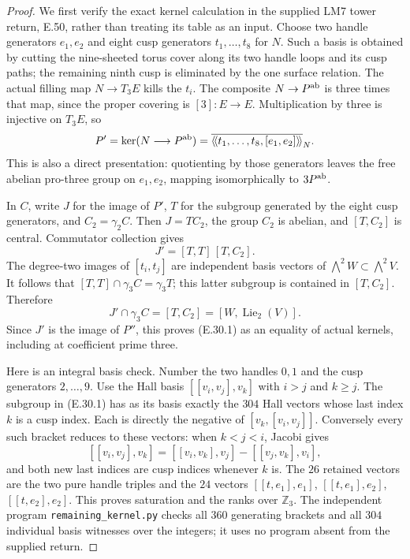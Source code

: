 \begin{proof}
We first verify the exact kernel calculation in the supplied
LM7 tower return, E.50, rather than treating its table as an input.
Choose two handle generators $e_1,e_2$ and eight cusp generators
$t_1,\ldots,t_8$ for $N$. Such a basis is obtained by cutting the
nine-sheeted torus cover along its two handle loops and its cusp
paths; the remaining ninth cusp is eliminated by the one surface
relation. The actual filling map $N\to T_3E$ kills the $t_i$.
The composite $N\to P^{\rm ab}$ is three times that map, since the
proper covering is $[3]:E\to E$. Multiplication by three is
injective on $T_3E$, so
\[
 P'=\ker(N\longrightarrow P^{\rm ab})
    =\overline{\langle\!\langle t_1,\ldots,t_8,[e_1,e_2]
                              \rangle\!\rangle}_N.
\]
This is also a direct presentation: quotienting by those generators
leaves the free abelian pro-three group on $e_1,e_2$, mapping
isomorphically to $3P^{\rm ab}$.

In $C$, write $J$ for the image of $P'$, $T$ for the subgroup
generated by the eight cusp generators, and $C_2=\gamma_2C$.
Then $J=T C_2$, the group $C_2$ is abelian, and $[T,C_2]$
is central. Commutator collection gives
\[
 J'=[T,T]\,[T,C_2].
\]
The degree-two images of $[t_i,t_j]$ are independent basis
vectors of $\bigwedge^2W\subset\bigwedge^2V$.
It follows that $[T,T]\cap\gamma_3C=\gamma_3T$;
this latter subgroup is contained in $[T,C_2]$.
Therefore
\[
 J'\cap\gamma_3C=[T,C_2]=[W,\operatorname{Lie}_2(V)].
\]
Since $J'$ is the image of $P''$, this proves (E.30.1)
as an equality of actual kernels, including at coefficient prime three.

Here is an integral basis check. Number the two handles $0,1$
and the cusp generators $2,\ldots,9$. Use the Hall basis
$[[v_i,v_j],v_k]$ with $i>j$ and $k\ge j$.
The subgroup in (E.30.1) has as its basis exactly the $304$
Hall vectors whose last index $k$ is a cusp index.
Each is directly the negative of $[v_k,[v_i,v_j]]$.
Conversely every such bracket reduces to these vectors:
when $k<j<i$, Jacobi gives
\[
 [[v_i,v_j],v_k]
   =[[v_i,v_k],v_j]-[[v_j,v_k],v_i],
\]
and both new last indices are cusp indices whenever $k$ is.
The $26$ retained vectors are the two pure handle triples
and the $24$ vectors
$[[t,e_1],e_1]$, $[[t,e_1],e_2]$, $[[t,e_2],e_2]$.
This proves saturation and the ranks over $\mathbb Z_3$.
The independent program \texttt{remaining\_kernel.py} checks
all $360$ generating brackets and all $304$ individual basis
witnesses over the integers; it uses no program absent from the
supplied return.


\end{proof}
